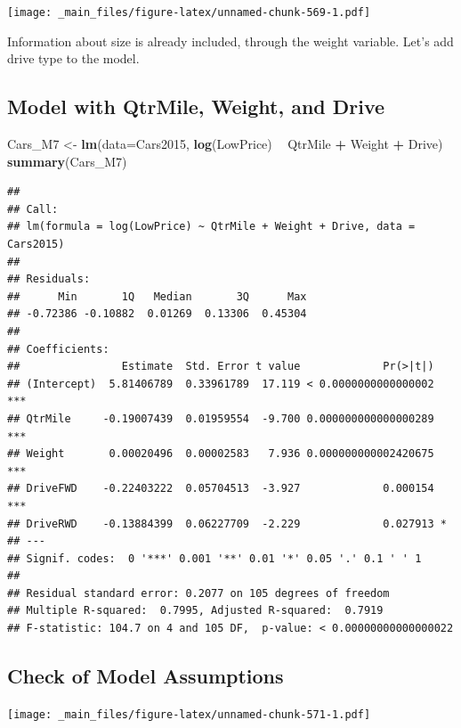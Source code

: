 \documentclass[]{book}
\newenvironment{Shaded}{\begin{snugshade}}{\end{snugshade}}
\newcommand{\KeywordTok}[1]{\textcolor[rgb]{0.13,0.29,0.53}{\textbf{#1}}}
\newcommand{\DataTypeTok}[1]{\textcolor[rgb]{0.13,0.29,0.53}{#1}}
\newcommand{\StringTok}[1]{\textcolor[rgb]{0.31,0.60,0.02}{#1}}
\newcommand{\OperatorTok}[1]{\textcolor[rgb]{0.81,0.36,0.00}{\textbf{#1}}}
\newcommand{\NormalTok}[1]{#1}
\begin{document}
\texttt{[image: \_main\_files/figure-latex/unnamed-chunk-569-1.pdf]}

Information about size is already included, through the weight variable.
Let's add drive type to the model.

\subsection{Model with QtrMile, Weight, and
Drive}\label{model-with-qtrmile-weight-and-drive}

\begin{Shaded}
\begin{Highlighting}[]
\NormalTok{Cars_M7 <-}\StringTok{ }\KeywordTok{lm}\NormalTok{(}\DataTypeTok{data=}\NormalTok{Cars2015, }\KeywordTok{log}\NormalTok{(LowPrice) }\OperatorTok{~}\StringTok{ }\NormalTok{QtrMile }\OperatorTok{+}\StringTok{ }\NormalTok{Weight }\OperatorTok{+}\StringTok{ }\NormalTok{Drive)}
\KeywordTok{summary}\NormalTok{(Cars_M7)}
\end{Highlighting}
\end{Shaded}

\begin{verbatim}
## 
## Call:
## lm(formula = log(LowPrice) ~ QtrMile + Weight + Drive, data = Cars2015)
## 
## Residuals:
##      Min       1Q   Median       3Q      Max 
## -0.72386 -0.10882  0.01269  0.13306  0.45304 
## 
## Coefficients:
##                Estimate  Std. Error t value             Pr(>|t|)    
## (Intercept)  5.81406789  0.33961789  17.119 < 0.0000000000000002 ***
## QtrMile     -0.19007439  0.01959554  -9.700 0.000000000000000289 ***
## Weight       0.00020496  0.00002583   7.936 0.000000000002420675 ***
## DriveFWD    -0.22403222  0.05704513  -3.927             0.000154 ***
## DriveRWD    -0.13884399  0.06227709  -2.229             0.027913 *  
## ---
## Signif. codes:  0 '***' 0.001 '**' 0.01 '*' 0.05 '.' 0.1 ' ' 1
## 
## Residual standard error: 0.2077 on 105 degrees of freedom
## Multiple R-squared:  0.7995, Adjusted R-squared:  0.7919 
## F-statistic: 104.7 on 4 and 105 DF,  p-value: < 0.00000000000000022
\end{verbatim}

\subsection{Check of Model
Assumptions}\label{check-of-model-assumptions}

\texttt{[image: \_main\_files/figure-latex/unnamed-chunk-571-1.pdf]}
\end{document}
